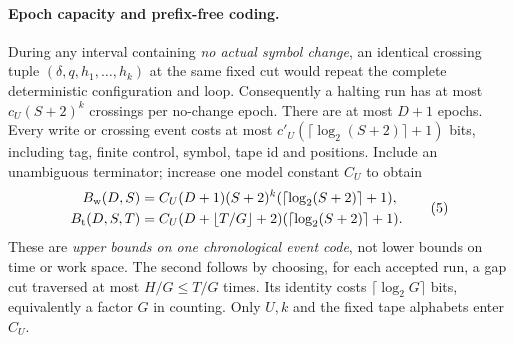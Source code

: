 \documentclass[11pt]{article}
\begin{document}
\paragraph{Epoch capacity and prefix-free coding.}
During any interval containing \emph{no actual symbol change}, an
identical crossing tuple $(\delta,q,h_1,\ldots,h_k)$ at the same fixed
cut would repeat the complete deterministic configuration and loop.
Consequently a halting run has at most
$c_U(S+2)^k$ crossings per no-change epoch.
There are at most $D+1$ epochs.  Every write or crossing event costs
at most $c'_U(\lceil\log_2(S+2)\rceil+1)$ bits, including tag, finite
control, symbol, tape id and positions.  Include an unambiguous
terminator; increase one model constant $C_U$ to obtain
\[
 \begin{aligned}
 B_{\rm w}(D,S)
   &=C_U(D+1)(S+2)^k
                   (\lceil\log_2(S+2)\rceil+1),\\
 B_{\rm t}(D,S,T)
   &=C_U(D+\lfloor T/G\rfloor+2)
                   (\lceil\log_2(S+2)\rceil+1).
 \end{aligned}
 \tag{5}
\]
These are \emph{upper bounds on one chronological event code},
not lower bounds on time or work space. The second follows by
choosing, for each accepted run, a gap cut traversed at most
$H/G\le T/G$ times. Its identity costs $\lceil\log_2G\rceil$
bits, equivalently a factor $G$ in counting.
Only $U,k$ and the fixed tape alphabets enter $C_U$.
\end{document}
